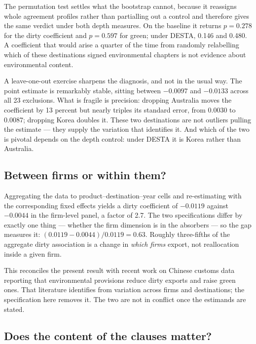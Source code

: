 \documentclass[11pt]{article}
\begin{document}
The permutation test settles what the bootstrap cannot, because it reassigns whole agreement
profiles rather than partialling out a control and therefore gives the same verdict under both depth
measures. On the baseline
it returns $p = 0.278$ for the dirty coefficient and $p = 0.597$ for green; under DESTA, 0.146 and
0.480. A coefficient that would arise a quarter of the time from randomly relabelling which of these
destinations signed environmental chapters is not evidence about environmental content.

A leave-one-out exercise sharpens the diagnosis, and not in the usual way. The point estimate is
remarkably stable, sitting between $-0.0097$ and $-0.0133$ across all 23 exclusions. What is fragile
is precision: dropping Australia moves the coefficient by 13 percent but nearly triples its standard
error, from 0.0030 to 0.0087; dropping Korea doubles it. These two destinations are not outliers
pulling the estimate --- they supply the variation that identifies it. And which of the two is
pivotal depends on the depth control: under DESTA it is Korea rather than Australia.

\subsection*{Between firms or within them?}

Aggregating the data to product--destination--year cells and re-estimating with the corresponding
fixed effects yields a dirty coefficient of $-0.0119$ against $-0.0044$ in the firm-level panel, a
factor of 2.7. The two specifications differ by exactly one thing --- whether the firm dimension is
in the absorbers --- so the gap measures it: $(0.0119-0.0044)/0.0119 = 0.63$. Roughly three-fifths of
the aggregate dirty association is a change in \emph{which firms} export, not reallocation inside a
given firm.

This reconciles the present result with recent work on Chinese customs data reporting that
environmental provisions reduce dirty exports and raise green ones. That literature identifies from
variation across firms and destinations; the specification here removes it. The two are not in
conflict once the estimands are stated.



\subsection*{Does the content of the clauses matter?}
\end{document}
